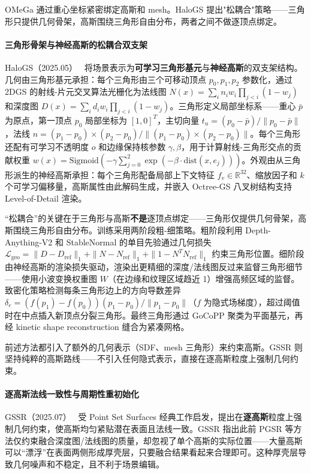 OMeGa 通过重心坐标紧密绑定高斯和 mesh。HaloGS 提出"松耦合"策略——三角形只提供几何骨架，高斯围绕三角形自由分布，两者之间不做逐顶点绑定。

\paragraph{三角形骨架与神经高斯的松耦合双支架}

HaloGS（2025.05）~\cite{2505_20267} 将场景表示为\textbf{可学习三角形基元}与\textbf{神经高斯}的双支架结构。几何由三角形基元承担：每个三角形由三个可移动顶点 $p_0, p_1, p_2$ 参数化，通过 2DGS 的射线-片元交叉算法光栅化为法线图 $N(x) = \sum_i n_i w_i \prod_{j<i}(1-w_j)$ 和深度图 $D(x) = \sum_i d_i w_i \prod_{j<i}(1-w_j)$。三角形定义局部坐标系——重心 $\bar{p}$ 为原点，第一顶点 $p_0$ 局部坐标为 $[1,0]^T$，主切向量 $t_u = (p_0 - \bar{p})/\|p_0 - \bar{p}\|$，法线 $n = (p_1-p_0) \times (p_2-p_0)/\|(p_1-p_0) \times (p_2-p_0)\|$。每个三角形还配有可学习不透明度 $o$ 和边缘保持核参数 $\gamma, \beta$，用于计算射线-三角形交点的贡献权重 $w(x) = \text{Sigmoid}(-\gamma \sum_{j=0}^2 \exp(-\beta \cdot \text{dist}(x, e_j)))$。外观由从三角形派生的神经高斯承担：每个三角形配备局部上下文特征 $f_v \in \mathbb{R}^{32}$、缩放因子和 $k$ 个可学习偏移量，高斯属性由此解码生成，并嵌入 Octree-GS 八叉树结构支持 Level-of-Detail 渲染。

“松耦合”的关键在于三角形与高斯\textbf{不是}逐顶点绑定——三角形仅提供几何骨架，高斯围绕三角形自由分布。训练采用两阶段粗-细策略。粗阶段利用 Depth-Anything-V2 和 StableNormal 的单目先验通过几何损失 $\mathcal{L}_{\text{geo}} = \|D - D_{\text{ref}}\|_1 + \|N - N_{\text{ref}}\|_1 + \|1 - N^T N_{\text{ref}}\|_1$ 约束三角形位置。细阶段由神经高斯的渲染损失驱动，渲染出更精细的深度/法线图反过来监督三角形细节——使用小波变换权重图 $W$（在边缘和纹理区域趋近 1）增强高频区域的监督。致密化策略检测每条三角形边上的方向导数差异 $\delta_e = (f(p_1)-f(p_0))(p_1-p_0)/\|p_1-p_0\|$（$f$ 为隐式场梯度），超过阈值时在中点插入新顶点分裂三角形。最终三角形通过 GoCoPP 聚类为平面基元，再经 kinetic shape reconstruction 缝合为紧凑网格。

前述方法都引入了额外的几何表示（SDF、mesh 三角形）来约束高斯。GSSR 则坚持纯粹的高斯路线——不引入任何隐式表示，直接在逐高斯粒度上强制几何约束。

\paragraph{逐高斯法线一致性与周期性重初始化}

GSSR（2025.07）~\cite{2507_18923} 受 Point Set Surfaces 经典工作启发，提出在\textbf{逐高斯}粒度上强制几何约束，使高斯均匀紧贴潜在表面且法线一致。GSSR 指出此前 PGSR 等方法仅约束融合深度图/法线图的质量，却忽视了单个高斯的实际位置——大量高斯可以“漂浮”在表面两侧形成厚壳层，只要融合结果看起来合理即可。这种厚壳层导致几何噪声和不稳定，且不利于场景编辑。

